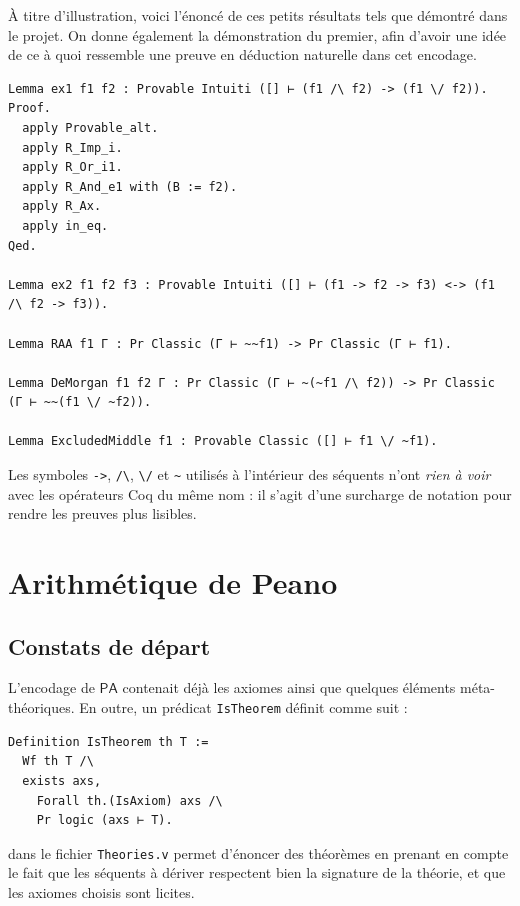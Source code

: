 \documentclass[a4paper]{article}
\newcommand{\PA}{\mathsf{PA}}
\theoremstyle{remark}
\theoremstyle{remark}
\theoremstyle{remark}
\theoremstyle{definition}
\theoremstyle{definition}
\theoremstyle{definition}
\begin{document}
\`A titre d'illustration, voici l'énoncé de ces petits résultats tels que démontré dans le projet. On donne également la démonstration du premier, afin d'avoir une idée de ce à quoi ressemble une preuve en déduction naturelle dans cet encodage.

\begin{verbatim}
Lemma ex1 f1 f2 : Provable Intuiti ([] ⊢ (f1 /\ f2) -> (f1 \/ f2)).
Proof.
  apply Provable_alt.
  apply R_Imp_i.
  apply R_Or_i1.
  apply R_And_e1 with (B := f2).
  apply R_Ax.
  apply in_eq.
Qed.

Lemma ex2 f1 f2 f3 : Provable Intuiti ([] ⊢ (f1 -> f2 -> f3) <-> (f1 /\ f2 -> f3)).

Lemma RAA f1 Γ : Pr Classic (Γ ⊢ ~~f1) -> Pr Classic (Γ ⊢ f1).

Lemma DeMorgan f1 f2 Γ : Pr Classic (Γ ⊢ ~(~f1 /\ f2)) -> Pr Classic (Γ ⊢ ~~(f1 \/ ~f2)).

Lemma ExcludedMiddle f1 : Provable Classic ([] ⊢ f1 \/ ~f1).
\end{verbatim}

\noindent \begin{minipage}[t]{0.05\linewidth}
\dbend
\end{minipage} \begin{minipage}[c]{0.95\linewidth}
Les symboles \verb+->+, \verb+/\+, \verb+\/+ et \verb+~+ utilisés à l'intérieur des séquents n'ont \emph{rien à voir} avec les opérateurs Coq du même nom : il s'agit d'une surcharge de notation pour rendre les preuves plus lisibles.
\end{minipage}

\section{Arithmétique de {\sc Peano}}

\subsection{Constats de départ}

L'encodage de $\PA$ contenait déjà les axiomes ainsi que quelques éléments méta-théoriques. En outre, un prédicat \verb+IsTheorem+ définit comme suit :
\begin{verbatim}
Definition IsTheorem th T :=
  Wf th T /\
  exists axs,
    Forall th.(IsAxiom) axs /\
    Pr logic (axs ⊢ T).
\end{verbatim}
dans le fichier \verb+Theories.v+ permet d'énoncer des théorèmes en prenant en compte le fait que les séquents à dériver respectent bien la signature de la théorie, et que les axiomes choisis sont licites.
\end{document}

